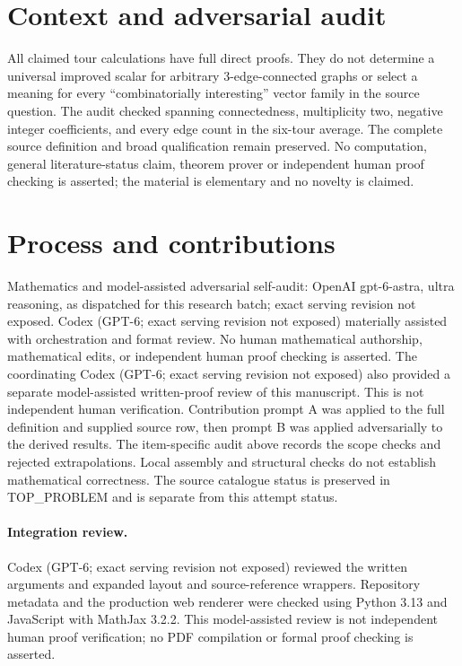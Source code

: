\documentclass[11pt]{article}
\begin{document}
\section{Context and adversarial audit}
All claimed tour calculations have full direct proofs. They do not determine
a universal improved scalar for arbitrary 3-edge-connected graphs or select
a meaning for every ``combinatorially interesting'' vector family in the
source question. The audit checked spanning connectedness, multiplicity two,
negative integer coefficients, and every edge count in the six-tour average.
The complete source definition and broad qualification remain preserved.
No computation, general literature-status claim, theorem prover or independent
human proof checking is asserted; the material is elementary and no novelty
is claimed.

\section{Process and contributions}
Mathematics and model-assisted adversarial self-audit: OpenAI gpt-6-astra, ultra reasoning, as dispatched for this research batch; exact serving revision not exposed. Codex (GPT-6; exact serving revision not exposed) materially assisted with orchestration and format review. No human mathematical authorship, mathematical edits, or independent human proof checking is asserted.
The coordinating Codex (GPT-6; exact serving revision not exposed) also provided a separate model-assisted written-proof review of this manuscript. This is not independent human verification.
Contribution prompt A was applied to the full definition and supplied source row, then prompt B was applied adversarially to the derived results. The item-specific audit above records the scope checks and rejected extrapolations. Local assembly and structural checks do not establish mathematical correctness. The source catalogue status is preserved in TOP\_PROBLEM and is separate from this attempt status.
\paragraph{Integration review.} Codex (GPT-6; exact serving revision not exposed) reviewed the written arguments and expanded layout and source-reference wrappers. Repository metadata and the production web renderer were checked using Python 3.13 and JavaScript with MathJax 3.2.2. This model-assisted review is not independent human proof verification; no PDF compilation or formal proof checking is asserted.
\end{document}
